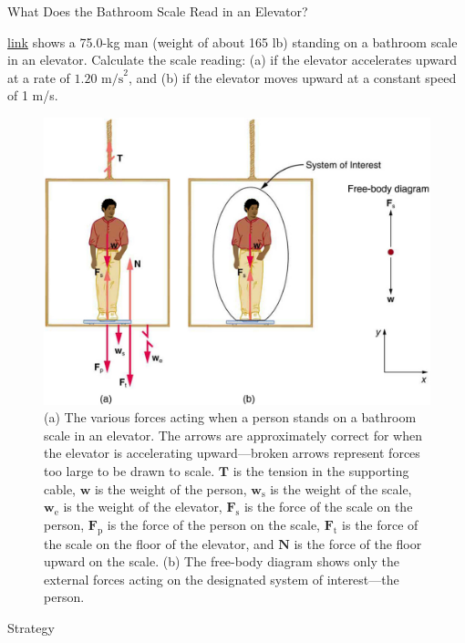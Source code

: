 \documentclass[
]{book}
\newenvironment{tinysection}{}{}
\begin{document}
\hypertarget{fs-id2654282}{}
What Does the Bathroom Scale Read in an Elevator?

\protect\hyperlink{import-auto-id347645}{link} shows a 75.0-kg
man (weight of about 165 lb) standing on a bathroom scale in an
elevator. Calculate the scale reading: (a) if the elevator accelerates
upward at a rate of \({1\text{.}\text{20\ m/s}^{2}}{}\), and (b) if the
elevator moves upward at a constant speed of 1 m/s.

\begin{figure}
\hypertarget{import-auto-id347645}{%
\centering
\includegraphics{images/Figure 04_07_03.jpg}
\caption{(a) The various forces acting when a person stands on a bathroom scale
in an elevator. The arrows are approximately correct for when the
elevator is accelerating upward---broken arrows represent forces too
large to be drawn to scale. \(\textbf{T}{}\) is the tension in the
supporting cable, \(\textbf{w}{}\) is the weight of the person,
\(\textbf{w}_{\text{s}}{}\) is the weight of the scale,
\(\textbf{w}_{\text{e}}{}\) is the weight of the elevator,
\(\textbf{F}_{\text{s}}{}\) is the force of the scale on the person,
\(\textbf{F}_{\text{p}}{}\) is the force of the person on the scale,
\(\textbf{F}_{\text{t}}{}\) is the force of the scale on the floor of the
elevator, and \(\textbf{N}{}\) is the force of the floor upward on the
scale. (b) The free-body diagram shows only the external forces acting
on the designated system of interest---the
person.}\label{import-auto-id347645}
}
\end{figure}

\begin{tinysection}

{Strategy}

\end{tinysection}
\end{document}
